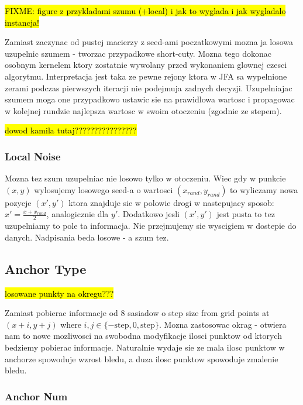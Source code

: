 \documentclass[format=acmsmall,screen,review,authordraft,nonacm]{acmart}
\begin{document}
\hl{FIXME: figure z przykladami szumu (+local) i jak to wyglada i jak wygladalo
instancja!}

Zamiast zaczynac od pustej macierzy z seed-ami poczatkowymi mozna ja losowa
uzupelnic szumem - tworzac przypadkowe short-cuty. Mozna tego dokonac osobnym
kernelem ktory zostatnie wywolany przed wykonaniem glownej czesci algorytmu.
Interpretacja jest taka ze pewne rejony ktora w JFA sa wypelnione zerami podczas
pierwszych iteracji nie podejmuja zadnych decyzji. Uzupelniajac szumem moga one
przypadkowo ustawic sie na prawidlowa wartosc i propagowac w kolejnej rundzie
najlepsza wartosc w swoim otoczeniu (zgodnie ze stepem).

\hl{dowod kamila tutaj????????????????}

\subsubsection{Local Noise} %

Mozna tez szum uzupelniac nie losowo tylko w otoczeniu. Wiec gdy w punkcie
$(x,y)$ wylosujemy losowego seed-a o wartosci $(x_{rand}, y_{rand})$ to
wyliczamy nowa pozycje $(x', y')$ ktora znajduje sie
w polowie drogi w nastepujacy sposob: $x' = \frac{x+x_{rand}}{2}$, analogicznie
dla $y'$. Dodatkowo jesli $(x', y')$ jest pusta to tez uzupelniamy to pole ta
informacja. Nie przejmujemy sie wyscigiem w dostepie do danych. Nadpisania beda
losowe - a szum tez.

\subsection{Anchor Type} %

\hl{losowane punkty na okregu???}

Zamiast pobierac informacje od 8 sasiadow o step size from grid points at
$(x+i, y+j)$ where $i, j \in \{-\text{step}, 0, \text{step}\}$. Mozna zastosowac
okrag - otwiera nam to nowe mozliwosci na swobodna modyfikacje ilosci punktow od
ktorych bedziemy pobierac informacje. Naturalnie wydaje sie ze mala ilosc
punktow w anchorze spowoduje wzrost bledu, a duza ilosc punktow spowoduje
zmalenie bledu.

\subsubsection{Anchor Num} %
\end{document}

